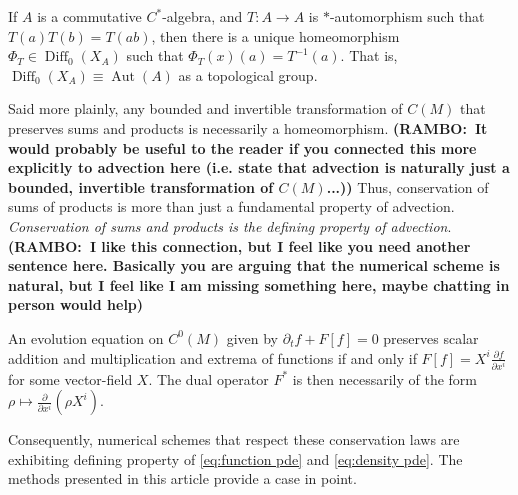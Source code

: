\documentclass[final,leqno]{siamltex1213}
\newcommand{\ram}[1]{{\normalsize{\textbf{({\color{red}RAMBO:\ }#1)}}}}
\newcommand{\pder}[2]{\ensuremath{\frac{ \partial #1}{\partial #2}}}
\DeclareMathOperator{\Diff}{Diff}
\begin{document}
\begin{corollary}
	If $A$ is a commutative $C^{*}$-algebra, and $T:A\to A$ is $*$-automorphism such that $T(a)T(b) = T(ab)$, then there is a unique homeomorphism $\Phi_{T} \in \Diff_{0}(X_{A})$ such that $\Phi_{T}(x) (a) = T^{-1}(a)$.
	That is, $\Diff_{0}(X_{A}) \equiv \operatorname{Aut}(A)$ as a topological group.
\end{corollary}

Said more plainly, any bounded and invertible transformation of $C(M)$ that preserves sums and products is necessarily a homeomorphism.
\ram{It would probably be useful to the reader if you connected this more explicitly to advection here (i.e. state that advection is naturally just a bounded, invertible transformation of $C(M)$...)}
Thus, conservation of sums of products is more than just a fundamental property of advection.
\emph{Conservation of sums and products is the defining property of advection}.
\ram{I like this connection, but I feel like you need another sentence here. 
Basically you are arguing that the numerical scheme is natural, but I feel like I am missing something here, maybe chatting in person would help}

\begin{corollary}
	An evolution equation on $C^{0}(M)$ given by $\partial_{t} f + F[f] = 0$ preserves scalar addition and multiplication and extrema of functions if and only if $F[f] = X^{i} \pder{f}{x^{i}}$ for some vector-field $X$.
	The dual operator $F^{*}$ is then necessarily of the form $\rho \mapsto \pder{}{x^{i}}( \rho X^{i})$.
\end{corollary}

Consequently, numerical schemes that respect these conservation laws are exhibiting defining property of \eqref{eq:function pde} and \eqref{eq:density pde}.
The methods presented in this article provide a case in point.%
\end{document}

